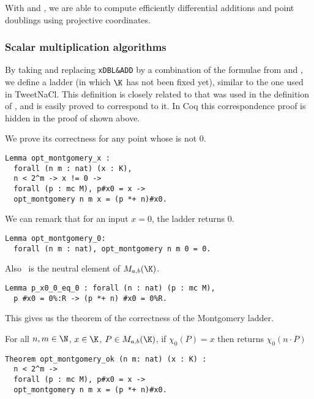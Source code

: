 With  and , we are able to compute efficiently
differential additions and point doublings using projective coordinates.

\subsubsection{Scalar multiplication algorithms}
\label{subsec:ECC-ladder}

By taking  and replacing \texttt{xDBL\&ADD} by a
combination of the formulae from  and ,
we define a ladder  (in which $\K$ has not been fixed yet),
similar to the one used in TweetNaCl.
This definition is closely related to  that was used
in the definition of , and is easily proved to correspond to it.
In Coq this correspondence proof is hidden in the proof of  shown above.

We prove its correctness for any point whose \xcoord is not 0.

\begin{lstlisting}[language=Coq,belowskip=-0.25 \baselineskip]
Lemma opt_montgomery_x :
  forall (n m : nat) (x : K),
  n < 2^m -> x != 0 ->
  forall (p : mc M), p#x0 = x ->
  opt_montgomery n m x = (p *+ n)#x0.
\end{lstlisting}
We can remark that for an input $x = 0$, the ladder returns $0$.
\begin{lstlisting}[language=Coq,belowskip=-0.25 \baselineskip]
Lemma opt_montgomery_0:
  forall (n m : nat), opt_montgomery n m 0 = 0.
\end{lstlisting}
Also \Oinf\ is the neutral element of $M_{a,b}(\K)$.
\begin{lstlisting}[language=Coq,belowskip=-0.25 \baselineskip]
Lemma p_x0_0_eq_0 : forall (n : nat) (p : mc M),
  p #x0 = 0%:R -> (p *+ n) #x0 = 0%R.
\end{lstlisting}
This gives us the theorem of the correctness of the Montgomery ladder.
\begin{theorem}
\label{thm:montgomery-ladder-correct}
For all $n, m \in \N$, $x \in \K$, $P \in M_{a,b}(\K)$,
if $\chi_0(P) = x$ then  returns $\chi_0(n \cdot P)$
\end{theorem}
\begin{lstlisting}[language=Coq,belowskip=-0.5 \baselineskip]
Theorem opt_montgomery_ok (n m: nat) (x : K) :
  n < 2^m ->
  forall (p : mc M), p#x0 = x ->
  opt_montgomery n m x = (p *+ n)#x0.
\end{lstlisting}

